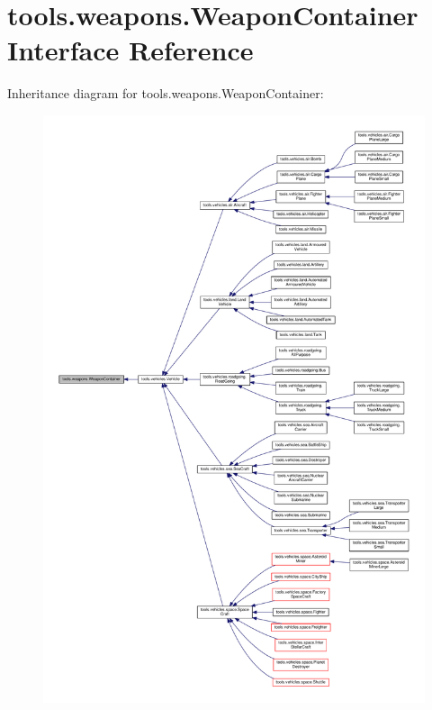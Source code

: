 \hypertarget{interfacetools_1_1weapons_1_1_weapon_container}{}\section{tools.\+weapons.\+Weapon\+Container Interface Reference}
\label{interfacetools_1_1weapons_1_1_weapon_container}


Inheritance diagram for tools.\+weapons.\+Weapon\+Container\+:
\nopagebreak
\begin{figure}[H]
\begin{center}
\leavevmode
\includegraphics[width=350pt]{interfacetools_1_1weapons_1_1_weapon_container__inherit__graph}
\end{center}
\end{figure}
